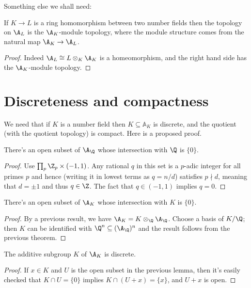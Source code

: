 Something else we shall need:

\begin{theorem}
  \label{NumberField.AdeleRing.baseChange_moduleTopology}
  If $K\to L$ is a ring homomorphism between two number fields then the topology on $\A_L$
  is the $\A_K$-module topology, where the module structure comes from the
  natural map $\A_K\to\A_L$.
\end{theorem}
\begin{proof}
  Indeed $\A_L\cong L\otimes_K\A_K$ is a homeomorphism, and
  the right hand side has the $\A_K$-module topology.
\end{proof}

\section{Discreteness and compactness}

We need that if $K$ is a number field then
$K\subseteq\mathbb{A}_K$ is discrete, and the quotient (with the
quotient topology) is compact. Here is a proposed proof.

\begin{theorem}
  \label{Rat.AdeleRing.zero_discrete}
  \leanok
  There's an open subset of $\A_{\Q}$ whose intersection with $\Q$ is $\{0\}$.
\end{theorem}
\begin{proof}
  Use $\prod_p{\Z_p}\times(-1,1)$. Any rational $q$ in this set is a $p$-adic
  integer for all primes $p$ and hence (writing it in lowest terms as $q=n/d$)
  satisfies $p\nmid d$, meaning that $d=\pm1$ and thus $q\in\Z$. The fact
  that $q\in(-1,1)$ implies $q=0$.
\end{proof}

\begin{theorem}
  \label{NumberField.AdeleRing.zero_discrete}
  \leanok
  There's an open subset of $\A_{K}$ whose intersection with $K$ is $\{0\}$.
\end{theorem}
\begin{proof}
  By a previous result, we have $\A_K=K\otimes_{\Q}\A_{\Q}$.
  Choose a basis of $K/\Q$; then $K$ can be identified with $\Q^n\subseteq(\A_{\Q})^n$
  and the result follows from the previous theorem.
\end{proof}

\begin{theorem}
  \label{NumberField.AdeleRing.discrete}
  \leanok
  The additive subgroup $K$ of $\A_K$ is discrete.
\end{theorem}
\begin{proof}
  If $x\in K$ and $U$ is the open subset in the previous lemma, then
  it's easily checked that $K\cap U=\{0\}$ implies $K\cap (U+x)=\{x\}$,
  and $U+x$ is open.
\end{proof}

